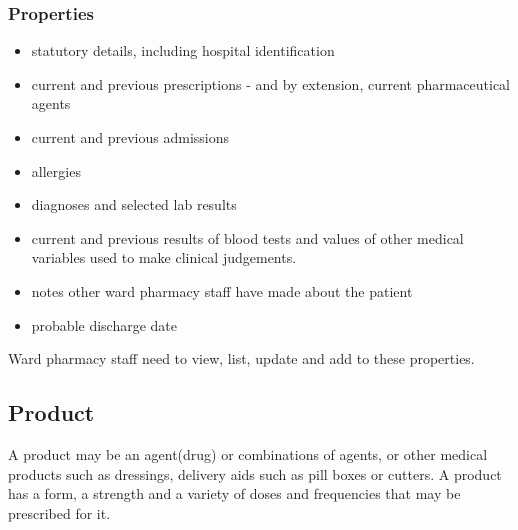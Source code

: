 \documentclass[letterpaper]{amsart}
\begin{document}
\subsubsection{Properties}
\begin{itemize}
    \item statutory details, including hospital identification
    \item current and previous prescriptions - and by extension, current pharmaceutical agents
    \item current and previous admissions
    \item allergies
    \item diagnoses and selected lab results 
    \item current and previous results of blood tests and values of other medical variables used to make clinical judgements. 
    \item notes other ward pharmacy staff have made about the patient 
    \item probable discharge date
\end{itemize}
Ward pharmacy staff need to view, list, update and add to these properties.

\subsection{Product}
A product may be an agent(drug) or combinations of agents, or other medical products such as dressings, delivery aids such as pill boxes or cutters.  
A product has a form, a strength and a variety of doses and frequencies that may be prescribed for it. 
\end{document}
